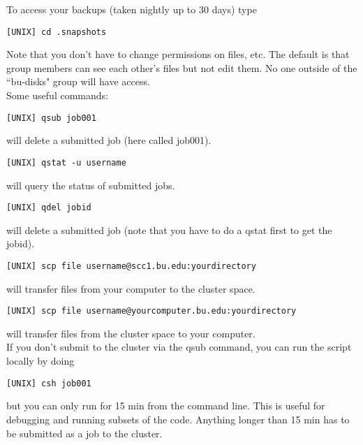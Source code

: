 \documentclass{article}
\begin{document}
\noindent To access your backups (taken nightly up to 30 days) type

\vspace{2mm}
\texttt{[UNIX] cd .snapshots}
\vspace{2mm}

\noindent Note that you don't have to change permissions on files, etc.  The default is that group members can see each other's files but not edit them.  No one outside of the ``bu-disks" group will have access.\\

\noindent Some useful commands:

\vspace{2mm}
\texttt{[UNIX] qsub job001}
\vspace{2mm}

\noindent will delete a submitted job (here called job001).

\vspace{2mm}
\texttt{[UNIX] qstat -u username}
\vspace{2mm}

\noindent will query the status of submitted jobs.


\vspace{2mm}
\texttt{[UNIX] qdel jobid}
\vspace{2mm}

\noindent will delete a submitted job (note that you have to do a qstat first to get the jobid).

\vspace{2mm}
\texttt{[UNIX] scp file username@scc1.bu.edu:yourdirectory}
\vspace{2mm}

\noindent will transfer files from your computer to the cluster space.

\vspace{2mm}
\texttt{[UNIX] scp file username@yourcomputer.bu.edu:yourdirectory}
\vspace{2mm}

\noindent will transfer files from the cluster space to your computer.\\

\noindent If you don't submit to the cluster via the qsub command, you can run the script locally by doing

\vspace{2mm}
\texttt{[UNIX] csh job001}
\vspace{2mm}

\noindent but you can only run for 15 min from the command line.  This is useful for debugging and running subsets of the code. Anything longer than 15 min has to be submitted as a job to the cluster.
\end{document}
